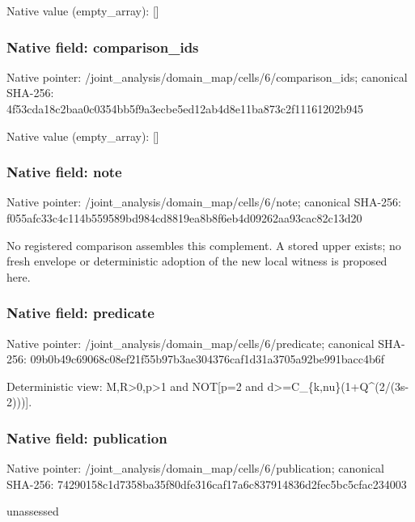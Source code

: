 \documentclass[10pt,a4paper]{article}
\begin{document}
Native value (empty\_\allowbreak{}array): []

\subsubsection{Native field: comparison\_\allowbreak{}ids}
Native pointer: /joint\_\allowbreak{}analysis/domain\_\allowbreak{}map/cells/6/comparison\_\allowbreak{}ids; canonical SHA-256: 4f53cda18c2baa0c0354bb5f9a3ecbe5ed12ab4d8e11ba873c2f11161202b945

Native value (empty\_\allowbreak{}array): []

\subsubsection{Native field: note}
Native pointer: /joint\_\allowbreak{}analysis/domain\_\allowbreak{}map/cells/6/note; canonical SHA-256: f055afc33c4c114b559589bd984cd8819ea8b8f6eb4d09262aa93cac82c13d20

\begingroup\raggedright\sloppy No registered comparison assembles this complement. A stored upper exists;\allowbreak{} no fresh envelope or deterministic adoption of the new local witness is proposed here.\par\endgroup

\subsubsection{Native field: predicate}
Native pointer: /joint\_\allowbreak{}analysis/domain\_\allowbreak{}map/cells/6/predicate; canonical SHA-256: 09b0b49c69068c08ef21f55b97b3ae304376caf1d31a3705a92be991bacc4b6f

\begingroup\raggedright\sloppy Deterministic view:\allowbreak{} M,\allowbreak{}R>0,\allowbreak{}p>1 and NOT[p=\allowbreak{}2 and d>=\allowbreak{}C\_\allowbreak{}\{k,\allowbreak{}nu\}(1+Q\textasciicircum{}(2/\allowbreak{}(3s-2)))].\par\endgroup

\subsubsection{Native field: publication}
Native pointer: /joint\_\allowbreak{}analysis/domain\_\allowbreak{}map/cells/6/publication; canonical SHA-256: 74290158c1d7358ba35f80dfe316caf17a6c837914836d2fec5bc5cfac234003

\begingroup\raggedright\sloppy unassessed\par\endgroup
\end{document}
